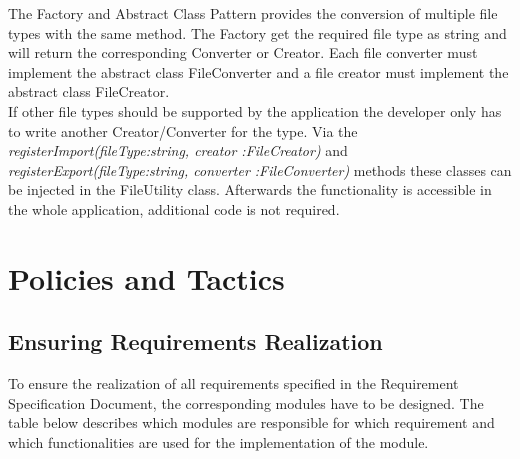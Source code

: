 \documentclass[notitlepage]{article}
\begin{document}
\begin{flushleft}
The Factory and Abstract Class Pattern provides the conversion of multiple file types with the same method. The Factory get the required file type as string and 
will return the corresponding Converter or Creator. Each file converter must implement the abstract class FileConverter and a file creator must implement
the abstract class FileCreator.\\
\medskip
If other file types should be supported by the application the developer only has to write another Creator/Converter for the type.
Via the \textit{registerImport(fileType:string, creator :FileCreator)} and \textit{registerExport(fileType:string, converter :FileConverter)} methods these classes can 
be injected in the FileUtility class. Afterwards the functionality is accessible in the whole application, additional code is not required.






\section{Policies and Tactics}


\subsection{Ensuring Requirements Realization}
To ensure the realization of all requirements specified in the Requirement Specification Document, the corresponding modules have to be designed.
The table below describes which modules are responsible for which requirement and which functionalities are used for the implementation of the module. \\


\end{flushleft}
\end{document}
